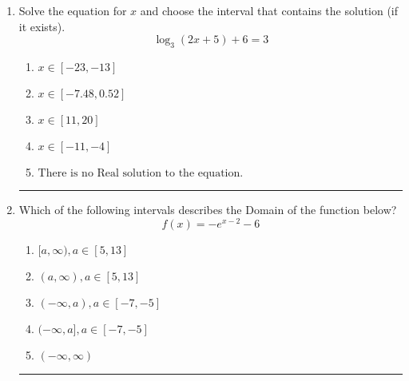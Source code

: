 \documentclass[14pt]{extbook}
\newcommand{\litem}[1]{\item#1\hspace*{-1cm}\rule{\textwidth}{0.4pt}}
\begin{document}
\begin{enumerate}
{\begin{enumerate}[label=\Alph*.]
\end{enumerate} }
\litem{
Solve the equation for $x$ and choose the interval that contains the solution (if it exists).\[ \log_{3}{(2x+5)}+6 = 3 \]\begin{enumerate}[label=\Alph*.]
\item \( x \in [-23, -13] \)
\item \( x \in [-7.48, 0.52] \)
\item \( x \in [11, 20] \)
\item \( x \in [-11, -4] \)
\item \( \text{There is no Real solution to the equation.} \)

\end{enumerate} }
\litem{
Which of the following intervals describes the Domain of the function below?\[ f(x) = -e^{x-2}-6 \]\begin{enumerate}[label=\Alph*.]
\item \( [a, \infty), a \in [5, 13] \)
\item \( (a, \infty), a \in [5, 13] \)
\item \( (-\infty, a), a \in [-7, -5] \)
\item \( (-\infty, a], a \in [-7, -5] \)
\item \( (-\infty, \infty) \)

\end{enumerate} }
\end{enumerate}
\end{document}

